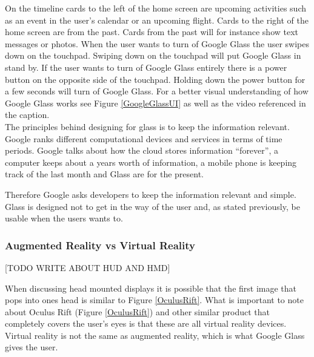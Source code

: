 On the timeline cards to the left of the home screen are upcoming activities such as an event in the user's calendar or an upcoming flight. Cards to the right of the home screen are from the past. Cards from the past will for instance show text messages or photos. When the user wants to turn of Google Glass the user swipes down on the touchpad. Swiping down on the touchpad will put Google Glass in stand by. If the user wants to turn of Google Glass entirely there is a power button on the opposite side of the touchpad. Holding down the power button for a few seconds will turn of Google Glass. For a better visual understanding of how Google Glass works see Figure \ref{GoogleGlassUI} as well as the video referenced in the caption.\\


The principles behind designing for glass is to keep the information relevant. Google ranks different computational devices and services in terms of time periods. Google talks about how the cloud stores information ``forever'', a computer keeps about a years worth of information, a mobile phone is keeping track of the last month and Glass are for the present.

Therefore Google asks developers to keep the information relevant and simple. Glass is designed not to get in the way of the user and, as stated previously, be usable when the users wants to.\cite{glassDesignPrinciples}

\subsubsection{Augmented Reality vs Virtual Reality}
\label{subsubsec:augmentedrealityvsvirtualreality}

[TODO WRITE ABOUT HUD AND HMD]

When discussing head mounted displays it is possible that the first image that pops into ones head is similar to Figure \ref{OculusRift}. What is important to note about Oculus Rift (Figure \ref{OculusRift}) and other similar product that completely covers the user's eyes is that these are all virtual reality devices. Virtual reality is not the same as augmented reality, which is what Google Glass gives the user.



